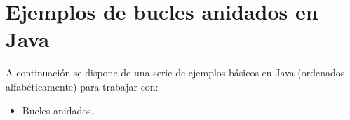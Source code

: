 \chapter{Ejemplos de bucles anidados en Java}

A continuación se dispone de una serie de ejemplos básicos en Java (ordenados alfabéticamente) para trabajar con:

\begin{itemize}
	\item Bucles anidados.
\end{itemize}

\centering

\begin{framed}
	
\end{framed}



\begin{framed}
	
\end{framed}


\begin{framed}
	
\end{framed}


\begin{framed}
	
\end{framed}


\begin{framed}
	
\end{framed}



\begin{framed}
	
\end{framed}


